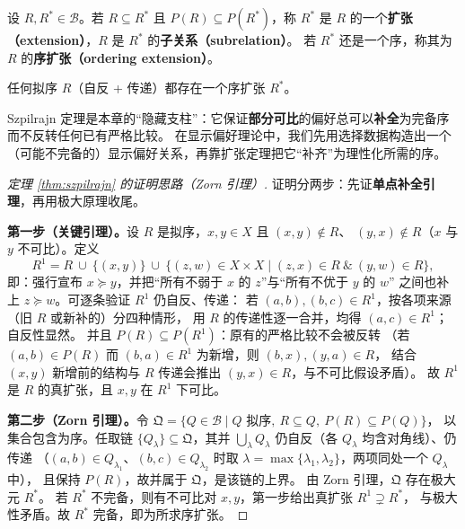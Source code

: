 \begin{definition}[扩张与子关系]
设 $R, R^*\in\mathcal{B}$。若 $R\subseteq R^*$ 且 $P(R)\subseteq P(R^*)$，称 $R^*$ 是 $R$
的一个\textbf{扩张（extension）}，$R$ 是 $R^*$ 的\textbf{子关系（subrelation）}。
若 $R^*$ 还是一个序，称其为 $R$ 的\textbf{序扩张（ordering extension）}。
\end{definition}

\begin{theorem}[Szpilrajn 1930]\label{thm:szpilrajn}
任何拟序 $R$（自反 + 传递）都存在一个序扩张 $R^*$。
\end{theorem}

\begin{remark}
Szpilrajn 定理是本章的“隐藏支柱”：它保证\textbf{部分可比}的偏好总可以\textbf{补全}为完备序而不反转任何已有严格比较。
在显示偏好理论中，我们先用选择数据构造出一个（可能不完备的）显示偏好关系，再靠扩张定理把它“补齐”为理性化所需的序。
\end{remark}

\begin{proof}[定理 \ref{thm:szpilrajn} 的证明思路（Zorn 引理）]
证明分两步：先证\textbf{单点补全引理}，再用极大原理收尾。

\textbf{第一步（关键引理）。}设 $R$ 是拟序，$x,y\in X$ 且 $(x,y)\notin R$、
$(y,x)\notin R$（$x$ 与 $y$ 不可比）。定义
\[
R^1 = R\ \cup\ \{(x,y)\}\ \cup\ \{(z,w)\in X\times X \mid (z,x)\in R\ \&\ (y,w)\in R\},
\]
即：强行宣布 $x\succeq y$，并把“所有不弱于 $x$ 的 $z$”与“所有不优于 $y$ 的 $w$”
之间也补上 $z\succeq w$。可逐条验证 $R^1$ 仍自反、传递：
若 $(a,b),(b,c)\in R^1$，按各项来源（旧 $R$ 或新补的）分四种情形，
用 $R$ 的传递性逐一合并，均得 $(a,c)\in R^1$；自反性显然。
并且 $P(R)\subseteq P(R^1)$：原有的严格比较不会被反转
（若 $(a,b)\in P(R)$ 而 $(b,a)\in R^1$ 为新增，则 $(b,x),(y,a)\in R$，
结合 $(x,y)$ 新增前的结构与 $R$ 传递会推出 $(y,x)\in R$，与不可比假设矛盾）。
故 $R^1$ 是 $R$ 的真扩张，且 $x,y$ 在 $R^1$ 下可比。

\textbf{第二步（Zorn 引理）。}令
$\mathfrak{Q}=\{Q\in\mathcal{B}\mid Q \text{ 拟序},\ R\subseteq Q,\ P(R)\subseteq P(Q)\}$，
以集合包含为序。任取链 $\{Q_\lambda\}\subseteq\mathfrak{Q}$，其并
$\bigcup_\lambda Q_\lambda$ 仍自反（各 $Q_\lambda$ 均含对角线）、仍传递
（$(a,b)\in Q_{\lambda_1}$、$(b,c)\in Q_{\lambda_2}$ 时取
$\lambda=\max\{\lambda_1,\lambda_2\}$，两项同处一个 $Q_\lambda$ 中），
且保持 $P(R)$，故并属于 $\mathfrak{Q}$，是该链的上界。
由 Zorn 引理，$\mathfrak{Q}$ 存在极大元 $R^*$。
若 $R^*$ 不完备，则有不可比对 $x,y$，第一步给出真扩张 $R^1\supsetneq R^*$，
与极大性矛盾。故 $R^*$ 完备，即为所求序扩张。
\end{proof}

